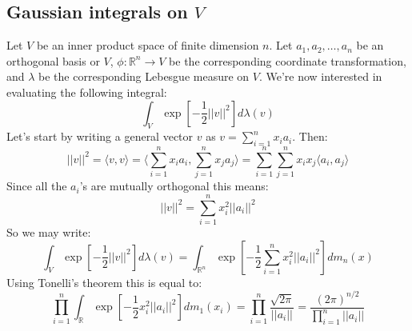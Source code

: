 \documentclass[12pt, a4paper]{article}
\numberwithin{equation}{section}
\begin{document}
\subsection{Gaussian integrals on $V$}
Let $V$ be an inner product space of finite dimension $n$. Let $a_1, a_2,\ldots, a_n$ be an orthogonal basis or $V$, $\phi:\mathbb{R}^n\rightarrow V$ be the corresponding coordinate transformation, and $\lambda$ be the corresponding Lebesgue measure on $V$. We're now interested in evaluating the following integral:
\begin{equation}
\int_V\exp\left[-\frac{1}{2}||v||^2\right]d\lambda(v)
\end{equation}
Let's start by writing a general vector $v$ as $v=\sum_{i=1}^n x_i a_i$. Then:
\begin{equation}
||v||^2=\langle v,v\rangle=\langle\sum_{i=1}^n x_i a_i,\sum_{j=1}^n x_j a_j\rangle=\sum_{i=1}^n\sum_{j=1}^n x_i x_j\langle a_i,a_j\rangle
\end{equation}
Since all the $a_i$'s are mutually orthogonal this means:
\begin{equation}
||v||^2=\sum_{i=1}^n x_i^2||a_i||^2
\end{equation}
So we may write:
\begin{equation}
\int_V\exp\left[-\frac{1}{2}||v||^2\right]d\lambda(v)=\int_{\mathbb{R}^n}\exp\left[-\frac{1}{2}\sum_{i=1}^n x_i^2||a_i||^2\right]dm_n(x)
\end{equation}
Using Tonelli's theorem this is equal to:
\begin{equation}
\prod_{i=1}^n\int_\mathbb{R}\exp\left[-\frac{1}{2}x_i^2||a_i||^2\right]dm_1(x_i)=\prod_{i=1}^n\frac{\sqrt{2\pi}}{||a_i||}=\frac{(2\pi)^{n/2}}{\prod_{i=1}^n||a_i||}
\end{equation}
\end{document}
